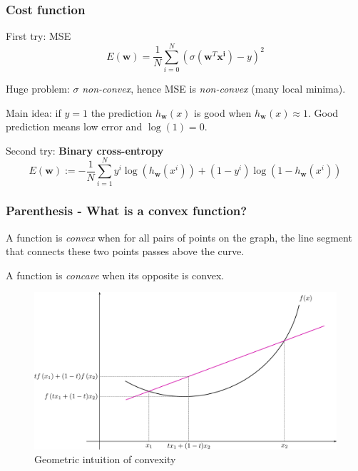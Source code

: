\documentclass{beamer}
\begin{document}
	\begin{frame}
		\frametitle{Cost function}
		
		First try: MSE
		\begin{equation*}
			E(\bm{w}) = \frac{1}{N} \sum_{i= 0}^{N} (\sigma(\bm{w}^T\bm{x^i}) - y)^2
		\end{equation*}
		
		Huge problem: $\sigma$ \textsl{non-convex}, hence MSE is \textsl{non-convex} (many local minima).
		
		\vspace{5mm}
		
		Main idea: if $y=1$ the prediction $h_{\bm{w}}(x)$ is good when $h_{\bm{w}}(x) \approx 1$. Good prediction means low error and $\log(1) = 0$.
		
		\vspace{5mm}
		
		Second try: \textbf{Binary cross-entropy}
		\begin{equation*}
			E(\bm{w}) := - \frac{1}{N} \sum_{i=1}^{N} y^i\log(h_{\bm{w}}(x^i)) + (1-y^i)\log(1-h_{\bm{w}}(x^i))
		\end{equation*}
		
		
		
	\end{frame}

	\begin{frame}
		\frametitle{Parenthesis - What is a convex function?}
		A function is \textsl{convex} when for all pairs of points on the graph, the line segment that connects these two points passes above the curve.
		
		A function is \textsl{concave} when its opposite is convex.
		
		\begin{figure}
			\centering
			\includegraphics[scale=0.1]{images/convexity}
			\caption{Geometric intuition of convexity}
		\end{figure}
	\end{frame}
\end{document}
